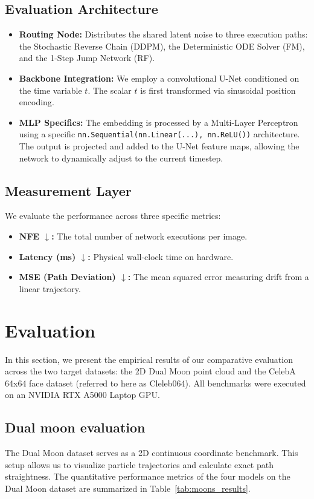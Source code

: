 \documentclass[11pt,a4paper]{article}
\begin{document}
\subsection{Evaluation Architecture}
\begin{itemize}
    \item \textbf{Routing Node:} Distributes the shared latent noise to three execution paths: the Stochastic Reverse Chain (DDPM), the Deterministic ODE Solver (FM), and the 1-Step Jump Network (RF)\cite{87}.
    \item \textbf{Backbone Integration:} We employ a convolutional U-Net conditioned on the time variable $t$\cite{119}. The scalar $t$ is first transformed via sinusoidal position encoding\cite{119}.
    \item \textbf{MLP Specifics:} The embedding is processed by a Multi-Layer Perceptron using a specific \texttt{nn.Sequential(nn.Linear(...), nn.ReLU())} architecture\cite{121}. The output is projected and added to the U-Net feature maps, allowing the network to dynamically adjust to the current timestep\cite{119}.
\end{itemize}

\subsection{Measurement Layer}
We evaluate the performance across three specific metrics\cite{87}:
\begin{itemize}
    \item \textbf{NFE $\downarrow$:} The total number of network executions per image\cite{87}.
    \item \textbf{Latency (ms) $\downarrow$:} Physical wall-clock time on hardware\cite{87}.
    \item \textbf{MSE (Path Deviation) $\downarrow$:} The mean squared error measuring drift from a linear trajectory\cite{87}.
\end{itemize}




\section{Evaluation}
In this section, we present the empirical results of our comparative evaluation across the two target datasets: the 2D Dual Moon point cloud and the CelebA 64x64 face dataset (referred to here as Cleleb064). All benchmarks were executed on an NVIDIA RTX A5000 Laptop GPU.

\subsection{Dual moon evaluation}
The Dual Moon dataset serves as a 2D continuous coordinate benchmark. This setup allows us to visualize particle trajectories and calculate exact path straightness. The quantitative performance metrics of the four models on the Dual Moon dataset are summarized in Table~\ref{tab:moons_results}.
\end{document}
